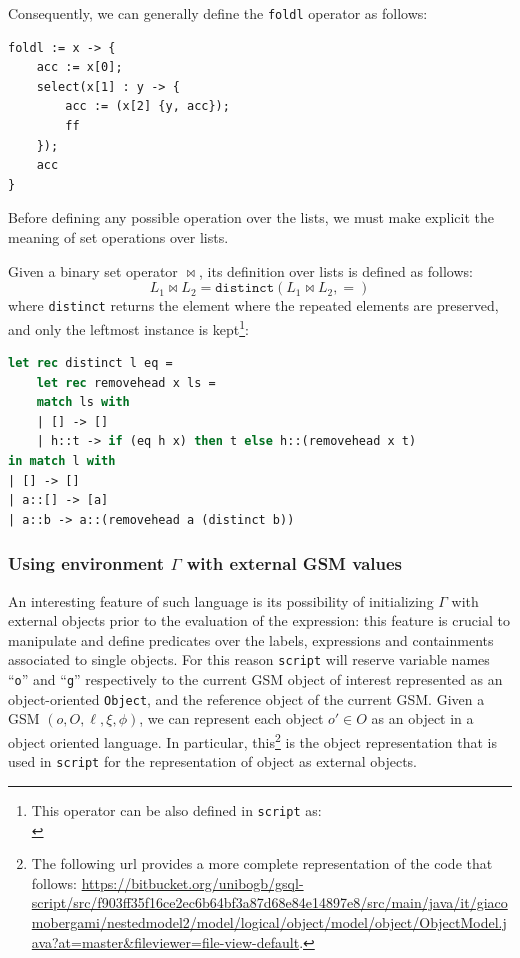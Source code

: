 Consequently, we can generally define the \texttt{foldl} operator as follows:
\begin{lstlisting}[language=Script]
foldl := x -> {
	acc := x[0];
	select(x[1] : y -> {
		acc := (x[2] {y, acc});
		ff
	});
	acc
}
\end{lstlisting}

Before defining any possible operation over the lists, we must make explicit the meaning of  set operations over lists.

\begin{definition}
	Given a binary set operator $\bowtie$, its definition over lists is defined as follows:
	\[L_1\bowtie L_2 = \texttt{distinct}(L_1\bowtie L_2,=)\]
	where \texttt{distinct} returns the element where the repeated elements are preserved, and only the leftmost instance is kept\footnote{This operator can be also defined in \texttt{script} as:\\ }:
\begin{lstlisting}[language=Caml]
let rec distinct l eq =
	let rec removehead x ls =
	match ls with
	| [] -> []
	| h::t -> if (eq h x) then t else h::(removehead x t)
in match l with
| [] -> []
| a::[] -> [a]
| a::b -> a::(removehead a (distinct b))
\end{lstlisting}
\end{definition}

\subsubsection{Using environment $\Gamma$ with external GSM values}\label{label:ucwegsmv}
An interesting feature of such language is its possibility of initializing $\Gamma$ with external objects prior to the evaluation of the expression: this feature is crucial to manipulate and define predicates over the labels, expressions and containments associated to single objects. For this reason \texttt{script} will reserve variable names ``\texttt{o}'' and ``\texttt{g}'' respectively to the current GSM object of interest represented as an object-oriented \texttt{Object}, and the reference object of the current GSM.
\label{app:JavaObject}
Given a GSM $(o,O,\ell,\xi,\phi)$, we can represent each object $o'\in O$ as an object in a object oriented language. In particular, this\footnote{The following url provides a more complete representation of the code that follows: \url{https://bitbucket.org/unibogb/gsql-script/src/f903ff35f16ce2ec6b64bf3a87d68e84e14897e8/src/main/java/it/giacomobergami/nestedmodel2/model/logical/object/model/object/ObjectModel.java?at=master&fileviewer=file-view-default}.} is the object representation that is used in \texttt{script} for the representation of object as external objects.

